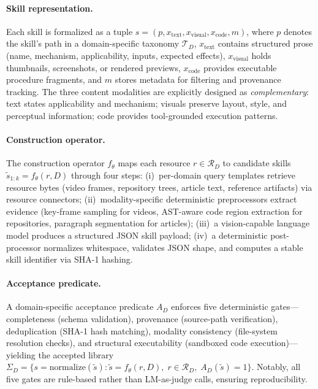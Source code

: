 \documentclass[11pt,a4paper]{article}
\begin{document}
\paragraph{Skill representation.}
Each skill is formalized as a tuple $s = (p, x_{\text{text}}, x_{\text{visual}}, x_{\text{code}}, m)$, where $p$ denotes the skill's path in a domain-specific taxonomy $\mathcal{T}_D$, $x_{\text{text}}$ contains structured prose (name, mechanism, applicability, inputs, expected effects), $x_{\text{visual}}$ holds thumbnails, screenshots, or rendered previews, $x_{\text{code}}$ provides executable procedure fragments, and $m$ stores metadata for filtering and provenance tracking. The three content modalities are explicitly designed as \emph{complementary}: text states applicability and mechanism; visuals preserve layout, style, and perceptual information; code provides tool-grounded execution patterns.

\paragraph{Construction operator.}
The construction operator $f_\theta$ maps each resource $r \in \mathcal{R}_D$ to candidate skills $\tilde{s}_{1:k} = f_\theta(r, D)$ through four steps: (i)~per-domain query templates retrieve resource bytes (video frames, repository trees, article text, reference artifacts) via resource connectors; (ii)~modality-specific deterministic preprocessors extract evidence (key-frame sampling for videos, AST-aware code region extraction for repositories, paragraph segmentation for articles); (iii)~a vision-capable language model produces a structured JSON skill payload; (iv)~a deterministic post-processor normalizes whitespace, validates JSON shape, and computes a stable skill identifier via SHA-1 hashing.

\paragraph{Acceptance predicate.}
A domain-specific acceptance predicate $A_D$ enforces five deterministic gates---completeness (schema validation), provenance (source-path verification), deduplication (SHA-1 hash matching), modality consistency (file-system resolution checks), and structural executability (sandboxed code execution)---yielding the accepted library $\Sigma_D = \{s = \text{normalize}(\tilde{s}) : \tilde{s} = f_\theta(r, D),\; r \in \mathcal{R}_D,\; A_D(\tilde{s}) = 1\}$. Notably, all five gates are rule-based rather than LM-as-judge calls, ensuring reproducibility.
\end{document}
